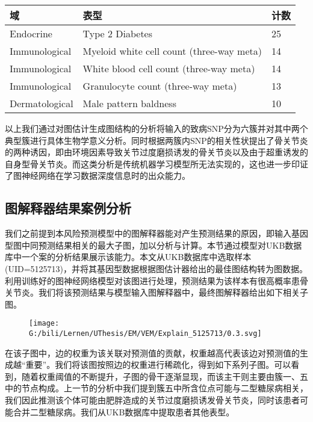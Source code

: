 \documentclass[
]{article}
\begin{document}
\begin{longtable}[]{@{}lll@{}}
\toprule()
域 & 表型 & 计数 \\
\midrule()
\endhead
Endocrine & Type 2 Diabetes & 25 \\
Immunological & Myeloid white cell count (three-way meta) & 14 \\
Immunological & White blood cell count (three-way meta) & 14 \\
Immunological & Granulocyte count (three-way meta) & 13 \\
Dermatological & Male pattern baldness & 10 \\
\bottomrule()
\end{longtable}

以上我们通过对图估计生成图结构的分析将输入的致病SNP分为六簇并对其中两个典型簇进行具体生物学意义分析。同时根据两簇内SNP的相关性状提出了骨关节炎的两种诱因，即由环境因素导致关节过度磨损诱发的骨关节炎以及由于超重诱发的自身型骨关节炎。而这类分析是传统机器学习模型所无法实现的，这也进一步印证了图神经网络在学习数据深度信息时的出众能力。

\hypertarget{ux56feux89e3ux91caux5668ux7ed3ux679cux6848ux4f8bux5206ux6790}{%
\subsection{图解释器结果案例分析}\label{ux56feux89e3ux91caux5668ux7ed3ux679cux6848ux4f8bux5206ux6790}}

我们之前提到本风险预测模型中的图解释器能对产生预测结果的原因，即输入基因型图中同预测结果相关的最大子图，加以分析与计算。本节通过模型对UKB数据库中一个案的分析结果展示该能力。本文从UKB数据库中选取样本(UID=5125713)，并将其基因型数据根据图估计器给出的最佳图结构转为图数据。利用训练好的图神经网络模型对该图进行处理，预测结果为该样本有很高概率患骨关节炎。我们将该预测结果与模型输入图解释器中，最终图解释器给出如下相关子图。

\begin{figure}
\centering
\texttt{[image: G:/bili/Lernen/UThesis/EM/VEM/Explain\_5125713/0.3.svg]}
\caption{}
\end{figure}

在该子图中，边的权重为该关联对预测值的贡献，权重越高代表该边对预测值的生成越``重要''。我们将该图按照边的权重进行稀疏化，得到如下系列子图。可以看到，随着权重阈值的不断提升，子图的骨干逐渐显现，而该主干则主要由簇一、五中的节点构成。上一节的分析中我们提到簇五中所含位点可能与二型糖尿病相关，我们因此推测该个体可能由肥胖造成的关节过度磨损诱发骨关节炎，同时该患者可能合并二型糖尿病。我们从UKB数据库中提取患者其他表型。
\end{document}
